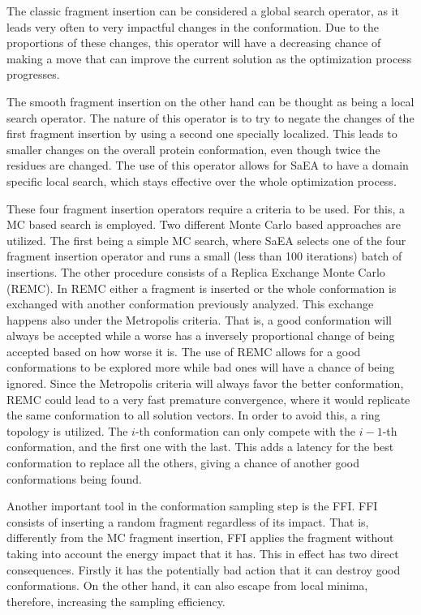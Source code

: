 The classic fragment insertion can be considered a global search
operator, as it leads very often to very impactful changes
in the conformation. Due to the proportions of these changes,
this operator will have a decreasing chance of making a move
that can improve the current solution as the optimization process
progresses.

The smooth fragment insertion on the other hand can be thought as
being a local search operator. The nature of this operator
is to try to negate the changes of the first fragment insertion by using
a second one specially localized. This leads to smaller changes on the
overall protein conformation, even though twice the residues are changed.
The use of this operator allows for \ac{SaEA} to have a domain specific local
search, which stays effective over the whole optimization process.

These four fragment insertion operators require a criteria to be used. For
this, a \ac{MC} based search is employed. Two different Monte Carlo based
approaches are utilized. The first being a simple \ac{MC} search, where
\ac{SaEA} selects one of the four fragment insertion operator and runs a small
(less than 100 iterations) batch of insertions. The other procedure consists of
a Replica Exchange Monte Carlo (REMC). In \ac{REMC} either a fragment is
inserted or the whole conformation is exchanged with another conformation
previously analyzed. This exchange happens also under the Metropolis criteria.
That is, a good conformation will always be accepted while a worse has a
inversely proportional change of being accepted based on how worse it is.  The
use of \ac{REMC} allows for a good conformations to be explored more while bad
ones will have a chance of being ignored. Since the Metropolis criteria will
always favor the better conformation, \ac{REMC} could lead to a very fast
premature convergence, where it would replicate the same conformation to all
solution vectors.  In order to avoid this, a ring topology is utilized. The
$i$-th conformation can only compete with the $i-1$-th conformation, and the
first one with the last. This adds a latency for the best conformation to
replace all the others, giving a chance of another good conformations being
found.

Another important tool in the conformation sampling step is the \ac{FFI}.
\ac{FFI} consists of inserting a random fragment regardless of its impact. That is,
differently from the \ac{MC} fragment insertion, \ac{FFI} applies the fragment
without taking into account the energy impact that it has. This in effect has
two direct consequences. Firstly it has the potentially bad action that it can
destroy good conformations. On the other hand, it can also escape from local
minima, therefore, increasing the sampling efficiency.


